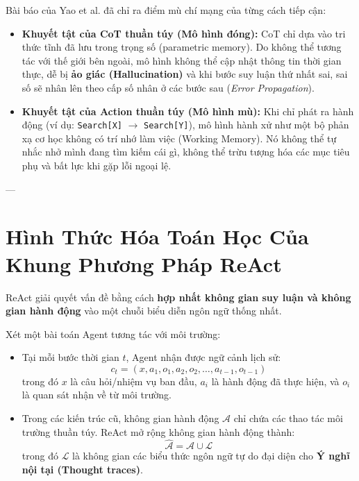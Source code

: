 \documentclass[11pt,a4paper]{article}
\begin{document}
\begin{coreconceptbox}
Bài báo của Yao et al. đã chỉ ra điểm mù chí mạng của từng cách tiếp cận:
\begin{itemize}[leftmargin=1.5em]
    \item \textbf{Khuyết tật của CoT thuần túy (Mô hình đóng):} CoT chỉ dựa vào tri thức tĩnh đã lưu trong trọng số (parametric memory). Do không thể tương tác với thế giới bên ngoài, mô hình không thể cập nhật thông tin thời gian thực, dễ bị \textbf{ảo giác (Hallucination)} và khi bước suy luận thứ nhất sai, sai số sẽ nhân lên theo cấp số nhân ở các bước sau (\textit{Error Propagation}).
    \item \textbf{Khuyết tật của Action thuần túy (Mô hình mù):} Khi chỉ phát ra hành động (ví dụ: \texttt{Search[X]} $\rightarrow$ \texttt{Search[Y]}), mô hình hành xử như một bộ phản xạ cơ học không có trí nhớ làm việc (Working Memory). Nó không thể tự nhắc nhở mình đang tìm kiếm cái gì, không thể trừu tượng hóa các mục tiêu phụ và bất lực khi gặp lỗi ngoại lệ.
\end{itemize}
\end{coreconceptbox}

---

\section{Hình Thức Hóa Toán Học Của Khung Phương Pháp ReAct}

ReAct giải quyết vấn đề bằng cách \textbf{hợp nhất không gian suy luận và không gian hành động} vào một chuỗi biểu diễn ngôn ngữ thống nhất.

\begin{formulationbox}
Xét một bài toán Agent tương tác với môi trường:
\begin{itemize}[leftmargin=1.5em]
    \item Tại mỗi bước thời gian $t$, Agent nhận được ngữ cảnh lịch sử:
    \begin{equation}
        c_t = (x, a_1, o_1, a_2, o_2, \dots, a_{t-1}, o_{t-1})
    \end{equation}
    trong đó $x$ là câu hỏi/nhiệm vụ ban đầu, $a_i$ là hành động đã thực hiện, và $o_i$ là quan sát nhận về từ môi trường.
    \item Trong các kiến trúc cũ, không gian hành động $\mathcal{A}$ chỉ chứa các thao tác môi trường thuần túy. ReAct mở rộng không gian hành động thành:
    \begin{equation}
        \hat{\mathcal{A}} = \mathcal{A} \cup \mathcal{L}
    \end{equation}
    trong đó $\mathcal{L}$ là không gian các biểu thức ngôn ngữ tự do đại diện cho \textbf{Ý nghĩ nội tại (Thought traces)}.
\end{itemize}
\end{formulationbox}
\end{document}
